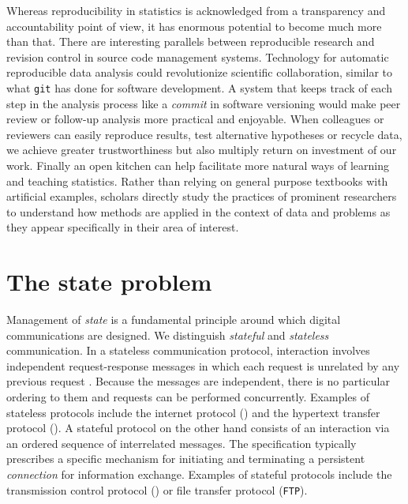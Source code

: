 Whereas reproducibility in statistics is acknowledged from a transparency and accountability point of view, it has enormous potential to become much more than that. There are interesting parallels between reproducible research and revision control in source code management systems. Technology for automatic reproducible data analysis could revolutionize scientific collaboration, similar to what \texttt{git} has done for software development. A system that keeps track of each step in the  analysis process like a \emph{commit} in software versioning would make peer review or follow-up analysis more practical and enjoyable. 
When colleagues or reviewers can easily reproduce results, test alternative hypotheses or recycle data, we achieve greater trustworthiness but also multiply return on investment of our work. Finally an open kitchen can help facilitate more natural ways of learning and teaching statistics. Rather than relying on general purpose textbooks with artificial examples, scholars directly study the practices of prominent researchers to understand how methods are applied in the context of data and problems as they appear specifically in their area of interest.


\section{The state problem}

Management of \emph{state} is a fundamental principle around which digital communications are designed. We distinguish \emph{stateful} and \emph{stateless} communication. In a stateless communication protocol, interaction involves independent request-response messages in which each request is unrelated by any previous request \citep{hennessy2012computer}. Because the messages are independent, there is no particular ordering to them and requests can be performed concurrently. Examples of stateless protocols include the internet protocol (\IP) and the hypertext transfer protocol (\HTTP). A stateful protocol on the other hand consists of an interaction via an ordered sequence of interrelated messages. The specification typically prescribes a specific mechanism for initiating and terminating a persistent \emph{connection} for information exchange. Examples of stateful protocols include the transmission control protocol (\TCP) or file transfer protocol (\texttt{FTP}).

